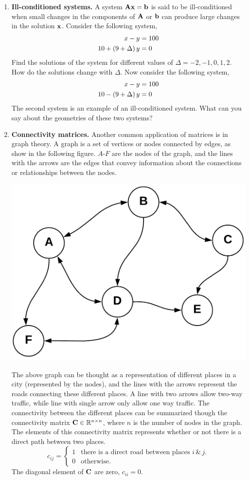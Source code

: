 \documentclass[9pt]{article}
\def\mf{\ensuremath\mathbf}
\def\mb{\ensuremath\mathbb}
\def\lp{\ensuremath\left(}
\def\rp{\ensuremath\right)}
\newcommand{\ct}[1]{\lp #1\rp}
\begin{document}
\begin{multicols}{2}
\begin{enumerate}
    \item \label{matrices:uncertain} \textbf{Ill-conditioned systems.} A system $\mf{A}\mf{x} = \mf{b}$ is said to be ill-conditioned when small changes in the components of $\mf{A}$ or $\mf{b}$ can produce large changes in the solution $\mf{x}$. Consider the following system,
    \begin{align}
    x - y &= 100 \nonumber \\
    10 + \ct{9 + \Delta}y &= 0 \nonumber
    \end{align}
    Find the solutions of the system for different values of $\Delta = -2, -1, 0, 1, 2$. How do the solutions change with $\Delta$. Now consider the following system,
    \begin{align}
    x - y &= 100 \nonumber \\
    10 - \ct{9 + \Delta}y &= 0 \nonumber
    \end{align}
    The second system is an example of an ill-conditioned system. What can you say about the geometries of these two systems?

    \item \textbf{Connectivity matrices.} Another common application of matrices is in graph theory. A graph is a set of vertices or nodes connected by edges, as show in the following figure. $A$-$F$ are the nodes of the graph, and the lines with the arrows are the edges that convey information about the connections or relationships between the nodes.
    \begin{center}
        \includegraphics[width=0.5\columnwidth]{../figs/graph.png}
    \end{center}
    The above graph can be thought as a representation of different places in a city (represented by the nodes), and the lines with the arrows represent the roads connecting these different places. A line with two arrows allow two-way traffic, while line with single arrow only allow one way traffic. The connectivity between the different places can be summarized though the connectivity matrix $\mf{C} \in \mb{R}^{n \times n}$, where $n$ is the number of nodes in the graph. The elements of this connectivity matrix  represents whether or not there is a direct path between two places.
    \[ 
    c_{ij} = \begin{cases}
        1 & \text{there is a direct road between places } i \, \& \,j. \\
        0 & \text{otherwise.}
    \end{cases}
    \]
    The diagonal element of $\mf{C}$ are zero, $c_{ii} = 0$.


\end{enumerate}
\end{multicols}
\end{document}
